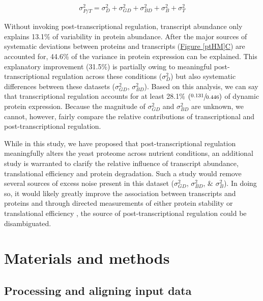 \begin{equation}
\sigma^{2}_{P/T} = \sigma^{2}_{D} + \sigma^{2}_{GD} + \sigma^{2}_{BD} + \sigma^{2}_{B} + \sigma^{2}_{T}\label{eq:sources_of_ptvar}
\end{equation}

Without invoking post-transcriptional regulation, transcript abundance only explains 13.1\% of variability in protein abundance. After the major sources of systematic deviations between proteins and transcripts (\hyperref[ptHM]{Figure \ref{ptHM}C}) are accounted for, 44.6\% of the variance in protein expression can be explained. This explanatory improvement (31.5\%) is partially owing to meaningful post-transcriptional regulation across these conditions ($\sigma^{2}_{D}$) but also systematic differences between these datasets ($\sigma^{2}_{GD}$, $\sigma^{2}_{BD}$). Based on this analysis, we can say that transcriptional regulation accounts for at least 28.1\% $\left(\sfrac{0.131}{0.446}\right)$ of dynamic protein expression. Because the magnitude of $\sigma^{2}_{GD}$ and $\sigma^{2}_{BD}$ are unknown, we cannot, however, fairly compare the relative contributions of transcriptional and post-transcriptional regulation.

While in this study, we have proposed that post-transcriptional regulation meaningfully alters the yeast proteome across nutrient conditions, an additional study is warranted to clarify the relative influence of transcript abundance, translational efficiency and protein degradation. Such a study would remove several sources of excess noise present in this dataset ($\sigma^{2}_{GD}$, $\sigma^{2}_{BD}$, $\&$ $\sigma^{2}_{B}$). In doing so, it would likely greatly improve the association between transcripts and proteins and through directed measurements of either protein stability or translational efficiency \cite{Belle:2006hv, Ingolia:2009dp}, the source of post-transcriptional regulation could be disambiguated.

\section{Materials and methods}

\subsection*{Processing and aligning input data}

